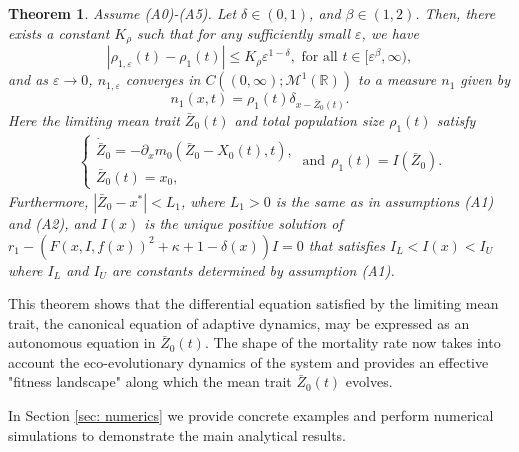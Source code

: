 \documentclass[]{article}
\newtheorem{theorem}{Theorem}
\theoremstyle{remark}
\begin{document}
\begin{theorem}\label{thm:IP_main}
Assume (A0)-(A5). Let $\delta\in(0,1)$, and $\beta\in(1,2)$. Then, there exists a constant $K_\rho$ such that for any sufficiently small $\varepsilon$, we have
\begin{equation}
    |\rho_{1,\varepsilon}(t)-\rho_1(t)|\leq{}K_\rho\varepsilon^{1-\delta}, \text{ for all } t\in[\varepsilon^\beta,\infty),
\end{equation}
and as $\varepsilon\rightarrow{0}$, $n_{1,\varepsilon}$ converges in $C((0,\infty);\mathcal{M}^{1}(\mathbb{R}))$ to a measure $n_1$ given by
\[n_1(x,t)=\rho_1(t)\delta_{x-\bar{Z}_{0}(t)}.\]
Here the limiting mean trait $\bar{Z}_0(t)$ and total population size $\rho_1(t)$ satisfy
\begin{align*}
   \begin{cases}
     \dot{\bar{Z}}_0=-\partial_{x}m_0(\bar{Z}_0-X_0(t),t),\\
     \bar{Z}_0(t)=x_0,
   \end{cases} ~\text{and}~~ \rho_1(t)=I(\bar{Z}_0). 
\end{align*}
Furthermore, $|\bar{Z}_0-x^{*}|<L_1$, where $L_1>0$ is the same as in assumptions (A1) and (A2), and $I(x)$ is the unique positive solution of $r_1-(F(x,I,f(x))^2+\kappa+1-\delta(x))I=0$ that satisfies $I_L<I(x)<I_U$ where $I_L$ and $I_U$ are constants determined by assumption (A1).


\end{theorem}
This theorem shows that the differential equation satisfied by the limiting mean trait, the canonical equation of adaptive dynamics, may be expressed as an autonomous equation in $\bar{Z}_0(t)$. The shape of the mortality rate now takes into account the eco-evolutionary dynamics of the system and provides an effective "fitness landscape" along which the mean trait $\bar{Z}_0(t)$ evolves.

In Section \ref{sec: numerics} we provide concrete examples and perform numerical simulations to demonstrate the main analytical results.
\end{document}
